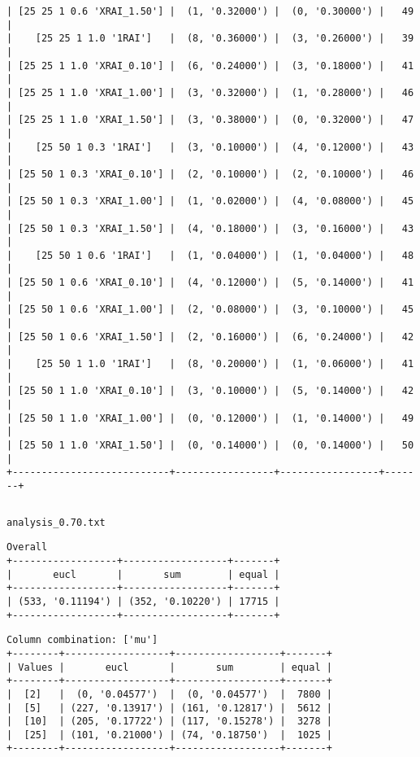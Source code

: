 \documentclass{article}
\begin{document}
\begin{verbatim}
| [25 25 1 0.6 'XRAI_1.50'] |  (1, '0.32000') |  (0, '0.30000') |   49  |
|    [25 25 1 1.0 '1RAI']   |  (8, '0.36000') |  (3, '0.26000') |   39  |
| [25 25 1 1.0 'XRAI_0.10'] |  (6, '0.24000') |  (3, '0.18000') |   41  |
| [25 25 1 1.0 'XRAI_1.00'] |  (3, '0.32000') |  (1, '0.28000') |   46  |
| [25 25 1 1.0 'XRAI_1.50'] |  (3, '0.38000') |  (0, '0.32000') |   47  |
|    [25 50 1 0.3 '1RAI']   |  (3, '0.10000') |  (4, '0.12000') |   43  |
| [25 50 1 0.3 'XRAI_0.10'] |  (2, '0.10000') |  (2, '0.10000') |   46  |
| [25 50 1 0.3 'XRAI_1.00'] |  (1, '0.02000') |  (4, '0.08000') |   45  |
| [25 50 1 0.3 'XRAI_1.50'] |  (4, '0.18000') |  (3, '0.16000') |   43  |
|    [25 50 1 0.6 '1RAI']   |  (1, '0.04000') |  (1, '0.04000') |   48  |
| [25 50 1 0.6 'XRAI_0.10'] |  (4, '0.12000') |  (5, '0.14000') |   41  |
| [25 50 1 0.6 'XRAI_1.00'] |  (2, '0.08000') |  (3, '0.10000') |   45  |
| [25 50 1 0.6 'XRAI_1.50'] |  (2, '0.16000') |  (6, '0.24000') |   42  |
|    [25 50 1 1.0 '1RAI']   |  (8, '0.20000') |  (1, '0.06000') |   41  |
| [25 50 1 1.0 'XRAI_0.10'] |  (3, '0.10000') |  (5, '0.14000') |   42  |
| [25 50 1 1.0 'XRAI_1.00'] |  (0, '0.12000') |  (1, '0.14000') |   49  |
| [25 50 1 1.0 'XRAI_1.50'] |  (0, '0.14000') |  (0, '0.14000') |   50  |
+---------------------------+-----------------+-----------------+-------+
\end{verbatim}

\begin{verbatim}

\end{verbatim}

\newpage
\verb|analysis_0.70.txt|
\begin{verbatim}
Overall
+------------------+------------------+-------+
|       eucl       |       sum        | equal |
+------------------+------------------+-------+
| (533, '0.11194') | (352, '0.10220') | 17715 |
+------------------+------------------+-------+
\end{verbatim}

\begin{verbatim}
Column combination: ['mu']
+--------+------------------+------------------+-------+
| Values |       eucl       |       sum        | equal |
+--------+------------------+------------------+-------+
|  [2]   |  (0, '0.04577')  |  (0, '0.04577')  |  7800 |
|  [5]   | (227, '0.13917') | (161, '0.12817') |  5612 |
|  [10]  | (205, '0.17722') | (117, '0.15278') |  3278 |
|  [25]  | (101, '0.21000') | (74, '0.18750')  |  1025 |
+--------+------------------+------------------+-------+
\end{verbatim}
\end{document}
